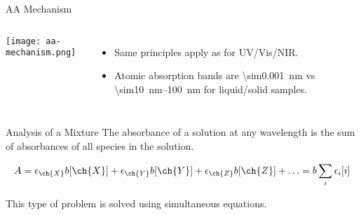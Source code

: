 \documentclass[handout]{beamer}
\begin{document}
\begin{frame}{AA Mechanism}
	\begin{columns}
		\begin{center}
			\texttt{[image: aa-mechanism.png]}
		\end{center}
		\begin{itemize}
			\item Same principles apply as for UV/Vis/NIR.
			\item Atomic absorption bands are
				\SI{\sim0.001}{\nano\meter} vs
				\SIrange{\sim10}{100}{\nano\meter} for
				liquid/solid samples.
		\end{itemize}
	\end{columns}
\end{frame}

\begin{frame}{Analysis of a Mixture}
	The absorbance of a solution at any wavelength is the
	\alert{sum} of absorbances of all species in the solution.

	\begin{equation*}
		A = \epsilon_{\ch{X}}b[\ch{X}] + \epsilon_{\ch{Y}}b[\ch{Y}] +
		\epsilon_{\ch{Z}}b[\ch{Z}] + \ldots = b\sum_i \epsilon_i[i]
	\end{equation*}

	This type of problem is solved using \alert{simultaneous equations}.
\end{frame}
%
\end{document}
